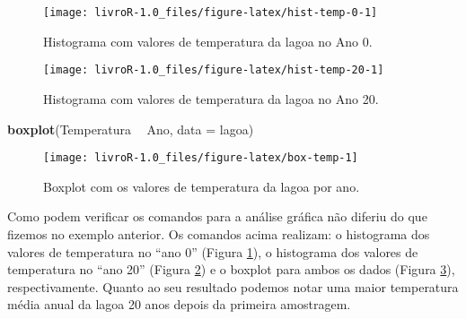 \documentclass[14pt,titlepage, oneside, openany, a4paper]{book}
\newenvironment{Shaded}{\begin{snugshade}}{\end{snugshade}}
\newcommand{\DataTypeTok}[1]{\textcolor[rgb]{0.13,0.29,0.53}{#1}}
\newcommand{\DecValTok}[1]{\textcolor[rgb]{0.00,0.00,0.81}{#1}}
\newcommand{\KeywordTok}[1]{\textcolor[rgb]{0.13,0.29,0.53}{\textbf{#1}}}
\newcommand{\NormalTok}[1]{#1}
\newcommand{\OperatorTok}[1]{\textcolor[rgb]{0.81,0.36,0.00}{\textbf{#1}}}
\newcommand{\StringTok}[1]{\textcolor[rgb]{0.31,0.60,0.02}{#1}}
\begin{document}
\begin{figure}[H]
\texttt{[image: livroR-1.0\_files/figure-latex/hist-temp-0-1]} \caption{Histograma com valores de temperatura da lagoa no Ano 0.}\label{fig:hist-temp-0}
\end{figure}

\begin{Shaded}
\end{Shaded}

\begin{figure}[H]
\texttt{[image: livroR-1.0\_files/figure-latex/hist-temp-20-1]} \caption{Histograma com valores de temperatura da lagoa no Ano 20.}\label{fig:hist-temp-20}
\end{figure}

\begin{Shaded}
\begin{Highlighting}[]
\KeywordTok{boxplot}\NormalTok{(Temperatura }\OperatorTok{~}\StringTok{ }\NormalTok{Ano, }\DataTypeTok{data =}\NormalTok{ lagoa)}
\end{Highlighting}
\end{Shaded}

\begin{figure}[H]
\texttt{[image: livroR-1.0\_files/figure-latex/box-temp-1]} \caption{Boxplot com os valores de temperatura da lagoa por ano.}\label{fig:box-temp}
\end{figure}

Como podem verificar os comandos para a análise gráfica não diferiu do que fizemos no exemplo anterior. Os comandos acima realizam: o histograma dos valores de temperatura no ``ano 0'' (Figura \ref{fig:hist-temp-0}), o histograma dos valores de temperatura no ``ano 20'' (Figura \ref{fig:hist-temp-20}) e o boxplot para ambos os dados (Figura \ref{fig:box-temp}), respectivamente. Quanto ao seu resultado podemos notar uma maior temperatura média anual da lagoa 20 anos depois da primeira amostragem.
\end{document}
